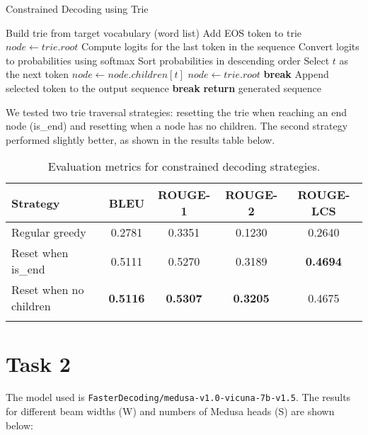 \documentclass[11pt]{article}
\begin{document}
\begin{algorithm}
\caption{Constrained Decoding using Trie}
\begin{algorithmic}[1]
\State Build trie from target vocabulary (word list)
\State Add EOS token to trie
\State $node \gets trie.root$
    \State Compute logits for the last token in the sequence
    \State Convert logits to probabilities using softmax
    \State Sort probabilities in descending order
            \State Select $t$ as the next token
            \State $node \gets node.children[t]$
             
                        \State $node \gets trie.root$ 
                    \EndIf
            \State \textbf{break}
        \EndIf
    \EndFor
    \State Append selected token to the output sequence
        \State \textbf{break}
    \EndIf
\EndFor
\State \textbf{return} generated sequence
\end{algorithmic}
\end{algorithm}

We tested two trie traversal strategies: resetting the trie when reaching an end node (is\_end) and resetting when a node has no children. The second strategy performed slightly better, as shown in the results table below.

\begin{longtable}{|l|c|c|c|c|}
    \hline
    \textbf{Strategy} & \textbf{BLEU} & \textbf{ROUGE-1} & \textbf{ROUGE-2} & \textbf{ROUGE-LCS} \\
    \hline
    Regular greedy & 0.2781 & 0.3351 & 0.1230 & 0.2640 \\
    \hline
    Reset when is\_end & 0.5111 & 0.5270 & 0.3189 & \textbf{0.4694} \\
    \hline
    Reset when no children & \textbf{0.5116} & \textbf{0.5307} & \textbf{0.3205} & 0.4675 \\
    \hline
    \caption{Evaluation metrics for constrained decoding strategies.}
\end{longtable}

\section{Task 2}
The model used is \texttt{FasterDecoding/medusa-v1.0-vicuna-7b-v1.5}.
The results for different beam widths (W) and numbers of Medusa heads (S) are shown below:
\end{document}
